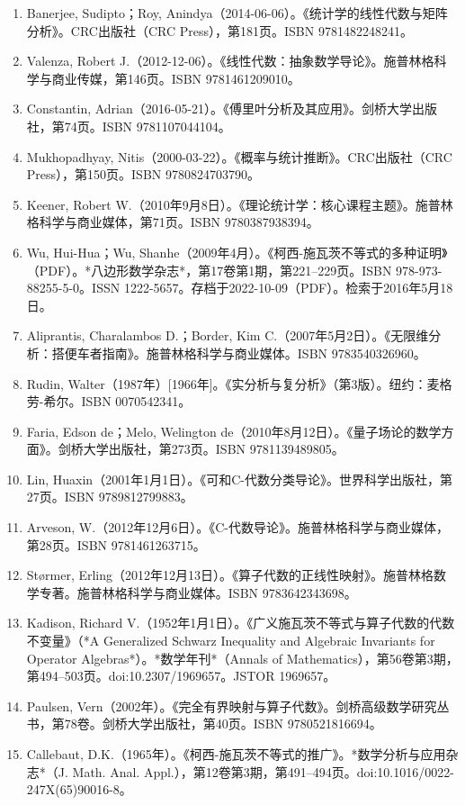 \begin{enumerate}
\item Banerjee, Sudipto；Roy, Anindya（2014-06-06）。《统计学的线性代数与矩阵分析》。CRC出版社（CRC Press），第181页。ISBN 9781482248241。
\item Valenza, Robert J.（2012-12-06）。《线性代数：抽象数学导论》。施普林格科学与商业传媒，第146页。ISBN 9781461209010。
\item Constantin, Adrian（2016-05-21）。《傅里叶分析及其应用》。剑桥大学出版社，第74页。ISBN 9781107044104。
\item Mukhopadhyay, Nitis（2000-03-22）。《概率与统计推断》。CRC出版社（CRC Press），第150页。ISBN 9780824703790。
\item Keener, Robert W.（2010年9月8日）。《理论统计学：核心课程主题》。施普林格科学与商业媒体，第71页。ISBN 9780387938394。
\item Wu, Hui-Hua；Wu, Shanhe（2009年4月）。《柯西-施瓦茨不等式的多种证明》（PDF）。*八边形数学杂志*，第17卷第1期，第221–229页。ISBN 978-973-88255-5-0。ISSN 1222-5657。存档于2022-10-09（PDF）。检索于2016年5月18日。
\item Aliprantis, Charalambos D.；Border, Kim C.（2007年5月2日）。《无限维分析：搭便车者指南》。施普林格科学与商业媒体。ISBN 9783540326960。
\item Rudin, Walter（1987年）[1966年]。《实分析与复分析》（第3版）。纽约：麦格劳-希尔。ISBN 0070542341。
\item Faria, Edson de；Melo, Welington de（2010年8月12日）。《量子场论的数学方面》。剑桥大学出版社，第273页。ISBN 9781139489805。
\item Lin, Huaxin（2001年1月1日）。《可和C\*-代数分类导论》。世界科学出版社，第27页。ISBN 9789812799883。
\item Arveson, W.（2012年12月6日）。《C\*-代数导论》。施普林格科学与商业媒体，第28页。ISBN 9781461263715。
\item Størmer, Erling（2012年12月13日）。《算子代数的正线性映射》。施普林格数学专著。施普林格科学与商业媒体。ISBN 9783642343698。
\item Kadison, Richard V.（1952年1月1日）。《广义施瓦茨不等式与算子代数的代数不变量》（*A Generalized Schwarz Inequality and Algebraic Invariants for Operator Algebras*）。*数学年刊*（Annals of Mathematics），第56卷第3期，第494–503页。doi:10.2307/1969657。JSTOR 1969657。
\item Paulsen, Vern（2002年）。《完全有界映射与算子代数》。剑桥高级数学研究丛书，第78卷。剑桥大学出版社，第40页。ISBN 9780521816694。
\item Callebaut, D.K.（1965年）。《柯西-施瓦茨不等式的推广》。*数学分析与应用杂志*（J. Math. Anal. Appl.），第12卷第3期，第491–494页。doi:10.1016/0022-247X(65)90016-8。

\end{enumerate}
